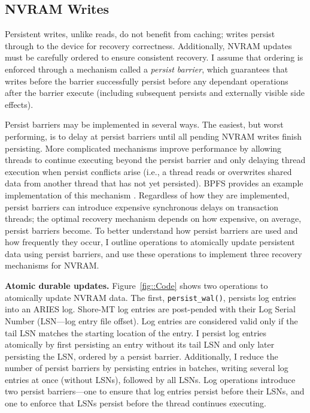 \subsection{NVRAM Writes}
\label{sec:OLTP_design:Design:Writes}

Persistent writes, unlike reads, do not benefit from cach\-ing; writes persist through to the device for recovery correctness.
Additionally, NVRAM updates must be carefully ordered to ensure consistent recovery.
I assume that ordering is enforced through a mechanism called a \emph{persist barrier}, which guarantees that writes before the barrier successfully persist before any dependant operations after the barrier execute (including subsequent persists and externally visible side effects).

Persist barriers may be implemented in several ways.
The easiest, but worst performing, is to delay at persist barriers until all pending NVRAM writes finish persisting.
More complicated mechanisms improve performance by allowing threads to continue executing beyond the persist barrier and only delaying thread execution when persist conflicts arise (i.e., a thread reads or overwrites shared data from another thread that has not yet persisted).
BPFS provides an example implementation of this mechanism \cite{ConditNightingale09}.
Regardless of how they are implemented, persist barriers can introduce expensive synchronous delays on transaction threads; the optimal recovery mechanism depends on how expensive, on average, persist barriers become.
To better understand how persist barriers are used and how frequently they occur, I outline operations to atomically update persistent data using persist barriers, and use these operations to implement three recovery mechanisms for NVRAM.


\textbf{Atomic durable updates.}
Figure~\ref{fig::Code} shows two operations to atomically update NVRAM data.
The first, \texttt{persist\_wal()}, persists log entries into an ARIES log.
Sho\-re-MT log entries are post-pended with their Log Serial Number (LSN---log entry file offset).
Log entries are considered valid only if the tail LSN matches the starting location of the entry.
I persist log entries atomically by first persisting an entry without its tail LSN and only later persisting the LSN, ordered by a persist barrier.
Additionally, I reduce the number of persist barriers by persisting entries in batches, writing several log entries at once (without LSNs), followed by all LSNs.
Log operations introduce two persist barriers---one to ensure that log entries persist before their LSNs, and one to enforce that LSNs persist before the thread continues executing.

